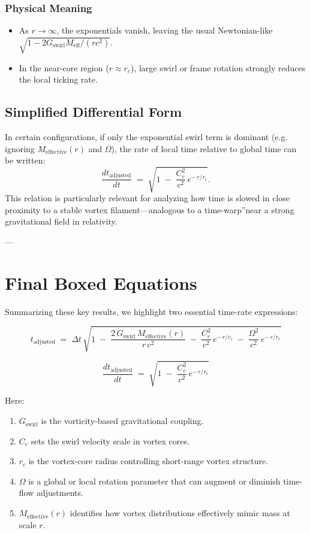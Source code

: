 \subsubsection{Physical Meaning}
\begin{itemize}
    \item As \(r \to \infty\), the exponentials vanish, leaving the usual Newtonian-like \(\sqrt{1 - 2G_\text{swirl} M_\text{eff} / (rc^2)}\).
    \item In the near-core region (\(r \approx r_c\)), large swirl or frame rotation strongly reduces the local ticking rate.
\end{itemize}

\subsection{Simplified Differential Form}
In certain configurations, if only the exponential swirl term is dominant (e.g. ignoring \(M_\text{effective}(r)\) and \(\Omega\)), the rate of local time relative to global time can be written:
\[
    \frac{d t_\text{adjusted}}{d t}
    \;=\;
    \sqrt{1 \;-\; \frac{C_e^2}{c^2}\, e^{-\,r/r_c}}.
\]
This relation is particularly relevant for analyzing how time is slowed in close proximity to a stable vortex filament—analogous to a \grqq time-warp\textquotedblright near a strong gravitational field in relativity.

---

\section{Final Boxed Equations}

Summarizing these key results, we highlight two essential time-rate expressions:

\[
    \boxed{
        t_\text{adjusted}
        \;=\;
        \Delta t \,\sqrt{
            1
            \;-\; \frac{2\,G_\text{swirl}\,M_\text{effective}(r)}{r\,c^2}
            \;-\; \frac{C_e^2}{c^2}\, e^{-\,r/r_c}
            \;-\; \frac{\Omega^2}{c^2}\, e^{-\,r/r_c}
        }
    }
\]

\[
    \boxed{
        \frac{d t_\text{adjusted}}{d t}
        \;=\;
        \sqrt{1 \;-\; \frac{C_e^2}{c^2}\, e^{-\,r/r_c}}
    }
\]

Here:
\begin{enumerate}
    \item \(G_\text{swirl}\) is the vorticity-based gravitational coupling.
    \item \(C_e\) sets the swirl velocity scale in vortex cores.
    \item \(r_c\) is the vortex-core radius controlling short-range vortex structure.
    \item \(\Omega\) is a global or local rotation parameter that can augment or diminish time-flow adjustments.
    \item \(M_\text{effective}(r)\) identifies how vortex distributions effectively mimic mass at scale \(r\).
\end{enumerate}

